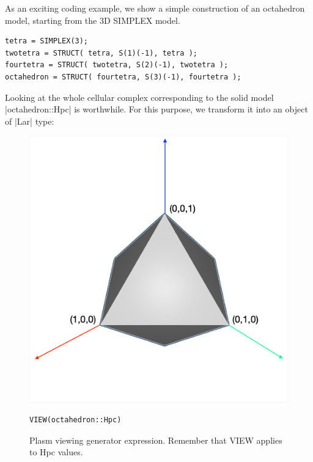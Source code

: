 \begin{coding}
As an exciting coding example, we show a simple construction of an octahedron model, starting from the 3D SIMPLEX model.
\begin{lstlisting}[language=JuliaLocal, style=julia, mathescape=false]
tetra = SIMPLEX(3);
twotetra = STRUCT( tetra, S(1)(-1), tetra );
fourtetra = STRUCT( twotetra, S(2)(-1), twotetra );
octahedron = STRUCT( fourtetra, S(3)(-1), fourtetra );
\end{lstlisting}

Looking at the whole cellular complex corresponding to the solid model |octahedron::Hpc| is worthwhile. For this purpose, we transform it into an object of |Lar| type:

\begin{figure}[htbp] %
\begin{minipage}[c]{0.35\textwidth}
   \includegraphics[width=\linewidth]{chapter-04/figs/octahedron} 
\end{minipage} \hfill
\begin{minipage}[c]{0.6\textwidth}
\begin{lstlisting}[language=JuliaLocal, style=julia, mathescape=false]
VIEW(octahedron::Hpc)
\end{lstlisting}
\caption{Plasm viewing generator expression. Remember that VIEW applies to Hpc values.}\label{fig:octahedron}
\end{minipage}
\end{figure}


\end{coding}
